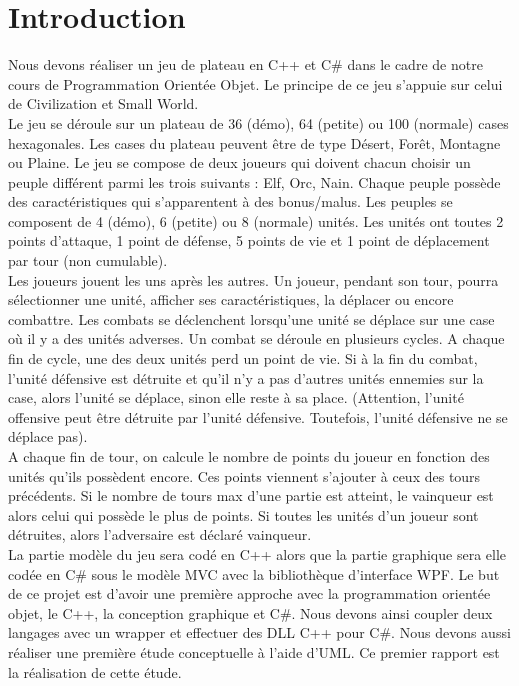 \documentclass[a4paper,11pt]{article}
\begin{document}
\section{Introduction}
Nous devons réaliser un jeu de plateau en C++ et C\# dans le cadre de notre cours de Programmation Orientée Objet. Le principe de ce jeu s'appuie sur celui de Civilization et Small World.\medskip\\
Le jeu se déroule sur un plateau de 36 (démo), 64 (petite) ou 100 (normale) cases hexagonales. Les cases du plateau peuvent être de type Désert, Forêt, Montagne ou Plaine. Le jeu se compose de deux joueurs qui doivent chacun choisir un peuple différent parmi les trois suivants : Elf, Orc, Nain. Chaque peuple possède des caractéristiques qui s'apparentent à des bonus/malus. Les peuples se composent de 4 (démo), 6 (petite) ou 8 (normale) unités. Les unités ont toutes 2 points d'attaque, 1 point de défense, 5 points de vie et 1 point de déplacement par tour (non cumulable).\medskip\\
Les joueurs jouent les uns après les autres. Un joueur, pendant son tour, pourra sélectionner une unité, afficher ses caractéristiques, la déplacer ou encore combattre. Les combats se déclenchent lorsqu'une unité se déplace sur une case où il y a des unités adverses. Un combat se déroule en plusieurs cycles. A chaque fin de cycle, une des deux unités perd un point de vie. Si à la fin du combat, l'unité défensive est détruite et qu'il n'y a pas d'autres unités ennemies sur la case, alors l'unité se déplace, sinon elle reste à sa place. (Attention, l'unité offensive peut être détruite par l'unité défensive. Toutefois, l'unité défensive ne se déplace pas).\medskip\\
A chaque fin de tour, on calcule le nombre de points du joueur en fonction des unités qu'ils possèdent encore. Ces points viennent s'ajouter à ceux des tours précédents. Si le nombre de tours max d'une partie est atteint, le vainqueur est alors celui qui possède le plus de points. Si toutes les unités d'un joueur sont détruites, alors l'adversaire est déclaré vainqueur.\medskip\\
La partie modèle du jeu sera codé en C++ alors que la partie graphique sera elle codée en C\# sous le modèle MVC avec la bibliothèque d'interface WPF. Le but de ce projet est d'avoir une première approche avec la programmation orientée objet, le C++, la conception graphique et C\#. Nous devons ainsi coupler deux langages avec un wrapper et effectuer des DLL C++ pour C\#.  Nous devons aussi réaliser une première étude conceptuelle à l'aide d'UML. Ce premier rapport est la réalisation de cette étude.
\end{document}

